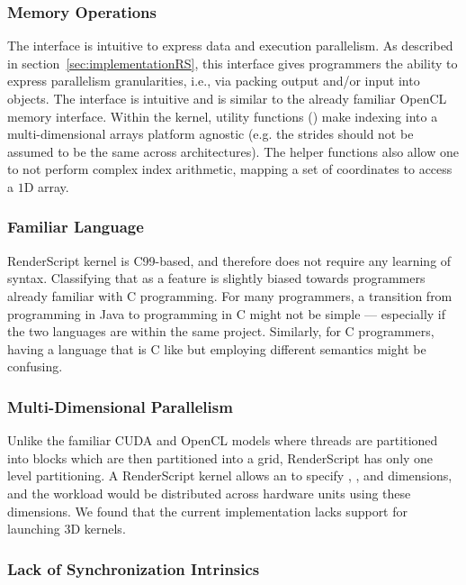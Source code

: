 \subsubsection{Memory Operations}

The  interface is intuitive to express data and
execution parallelism. As described in section~\ref{sec:implementationRS}, this
 interface gives programmers the ability to express parallelism
granularities, i.e., via packing output and/or input into  objects.
The interface is intuitive and is similar to the already familiar OpenCL memory interface.
Within the kernel, utility functions () make indexing
into a multi-dimensional arrays platform agnostic (e.g. the strides should not
be assumed to be the same across architectures).  The helper functions also
allow one to not perform complex index arithmetic, mapping a set of coordinates
to access a $1$D array.


\subsubsection{Familiar Language}

RenderScript kernel is C99-based, and therefore does not require any learning of
syntax.  Classifying that as a feature is slightly biased towards programmers
already familiar with C programming.  For many programmers, a transition from
programming in Java to programming in C might not be simple --- especially if
the two languages are within the same project.  Similarly, for C programmers,
having a language that is C like but employing different semantics might be
confusing.


\subsubsection{Multi-Dimensional Parallelism}

Unlike the familiar CUDA and OpenCL models where threads are partitioned into
blocks which are then partitioned into a grid, RenderScript has only one level
partitioning.  A RenderScript kernel allows an  to specify
, , and  dimensions, and the workload would be distributed
across hardware units using these dimensions.  We found that the current
implementation lacks support for launching $3$D kernels.

\subsubsection{Lack of Synchronization Intrinsics}

